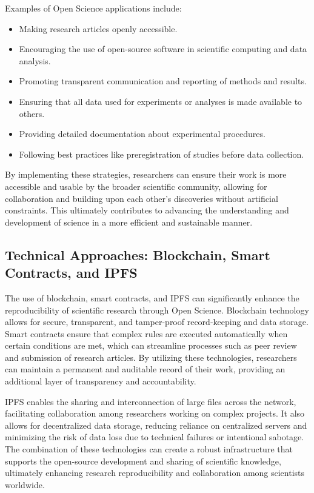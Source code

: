 Examples of Open Science applications include:
\begin{itemize}
    \item Making research articles openly accessible.
    \item Encouraging the use of open-source software in scientific computing and data analysis.
    \item Promoting transparent communication and reporting of methods and results.
    \item Ensuring that all data used for experiments or analyses is made available to others.
    \item Providing detailed documentation about experimental procedures.
    \item Following best practices like preregistration of studies before data collection.
\end{itemize}

By implementing these strategies, researchers can ensure their work is more accessible and usable by the broader scientific community, allowing for collaboration and building upon each other's discoveries without artificial constraints. This ultimately contributes to advancing the understanding and development of science in a more efficient and sustainable manner.

\subsection{Technical Approaches: Blockchain, Smart Contracts, and IPFS}

The use of blockchain, smart contracts, and IPFS can significantly enhance the reproducibility of scientific research through Open Science. Blockchain technology allows for secure, transparent, and tamper-proof record-keeping and data storage. Smart contracts ensure that complex rules are executed automatically when certain conditions are met, which can streamline processes such as peer review and submission of research articles. By utilizing these technologies, researchers can maintain a permanent and auditable record of their work, providing an additional layer of transparency and accountability.

IPFS enables the sharing and interconnection of large files across the network, facilitating collaboration among researchers working on complex projects. It also allows for decentralized data storage, reducing reliance on centralized servers and minimizing the risk of data loss due to technical failures or intentional sabotage. The combination of these technologies can create a robust infrastructure that supports the open-source development and sharing of scientific knowledge, ultimately enhancing research reproducibility and collaboration among scientists worldwide.

